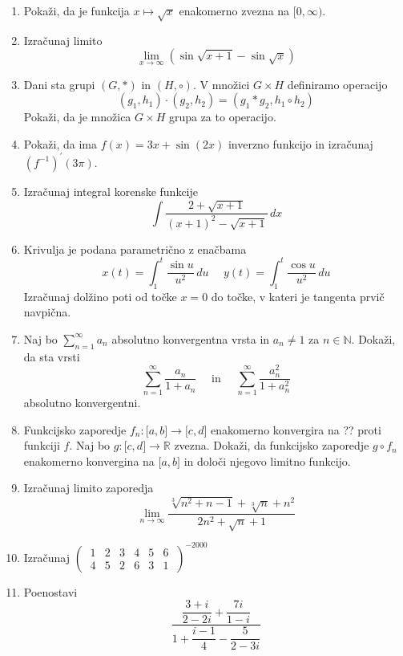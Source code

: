 \documentclass[a4paper,12pt]{article}
\begin{document}
\begin{enumerate}
\item Pokaži, da je funkcija $ x \mapsto \sqrt{x} $  enakomerno zvezna na 
$\lbrack 0,\infty ) $.

\item Izračunaj limito
$$ \lim_{x \to \infty}(\sin \sqrt{x + 1} - \sin \sqrt{x}) $$

\item Dani sta grupi $ (G,\ast) $ in $ (H,\circ) $. V množici $ G \times H $ 
definiramo operacijo
$$ (g_1,h_1) \cdot (g_2,h_2) = (g_1 \ast g_2,h_1 \circ h_2) $$
Pokaži, da je množica $ G \times H $  grupa za to operacijo.

\item Pokaži, da ima $ f(x) = 3x + \sin(2x) $ inverzno funkcijo in izračunaj 
$ (f^{-1})^\prime (3 \pi) $.

\item Izračunaj integral korenske funkcije
$$ \int \frac{2 + \sqrt{x + 1}}{(x + 1)^2 - \sqrt{x + 1}} \,dx $$

\item Krivulja je podana parametrično z enačbama
$$ x(t) = \int_{1}^{t} \frac{\sin u}{u^2} \,du ~~~~~~ y(t) = \int_{1}^{t} \frac{\cos u}{u^2} \,du $$
Izračunaj dolžino poti od točke $ x = 0 $ do točke, v kateri je tangenta prvič 
navpična.

\item Naj bo $ \sum_{n = 1}^{\infty} a_n $ absolutno konvergentna vrsta in 
$ a_n \neq 1 $ za $ n \in \mathbb{N} $.
Dokaži, da sta vrsti
$$ \sum_{n = 1}^{\infty} \frac{a_n}{1 + a_n} ~~~~~~ \text{in} ~~~~~~ 
\sum_{n = 1}^{\infty} \frac{a_n^2}{1 + a_n^2} $$
absolutno konvergentni.

\item Funkcijsko zaporedje $ f_n: \lbrack a,b \rbrack \to \lbrack c,d \rbrack $ 
enakomerno konvergira na ?? proti funkciji $ f $.
Naj bo $ g: \lbrack c,d \rbrack \to \mathbb{R} $ zvezna. Dokaži, da funkcijsko 
zaporedje $ g \circ f_n $ enakomerno konvergina na $ \lbrack a,b \rbrack $ in 
določi njegovo limitno funkcijo.

\item Izračunaj limito zaporedja
$$ \lim_{n \to \infty} \frac{\sqrt[3]{n^2 + n -1} + \sqrt[3]{n} + n^2}
{2n^2 + \sqrt{n} + 1} $$

\item Izračunaj
$
\begin{pmatrix}
    ~ 1 & 2 & 3 & 4 & 5 & 6 ~ \\
    ~ 4 & 5 & 2 & 6 & 3 & 1 ~ 
\end{pmatrix}^{-2000} $
\pagebreak
\item Poenostavi 
$$ \frac{\dfrac{3 + i}{2 - 2i} + \dfrac{7i}{1 -i}}
{1 + \dfrac{i - 1}{4} - \dfrac{5}{2 - 3i}} $$ 


\end{enumerate}
\end{document}
